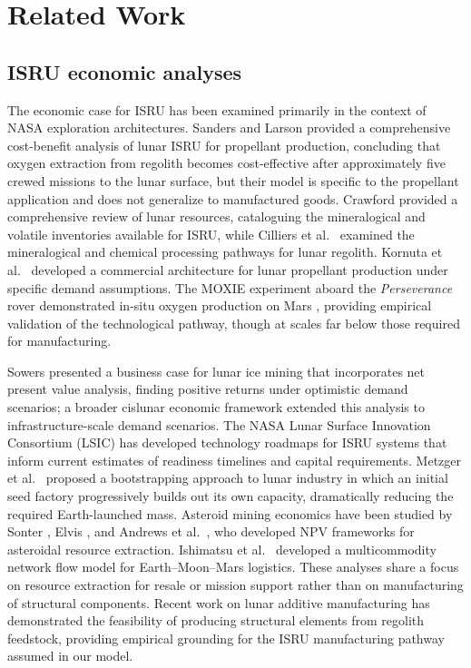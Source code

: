 \documentclass[preprint,12pt]{elsarticle}
\begin{document}
\section{Related Work}
\label{sec:related}

\subsection{ISRU economic analyses}

The economic case for ISRU has been examined primarily in the context of NASA exploration architectures. Sanders and Larson \cite{sanders2015} provided a comprehensive cost-benefit analysis of lunar ISRU for propellant production, concluding that oxygen extraction from regolith becomes cost-effective after approximately five crewed missions to the lunar surface, but their model is specific to the propellant application and does not generalize to manufactured goods. Crawford \cite{crawford2015} provided a comprehensive review of lunar resources, cataloguing the mineralogical and volatile inventories available for ISRU, while Cilliers et al.\ \cite{cilliers2023} examined the mineralogical and chemical processing pathways for lunar regolith. Kornuta et al.\ \cite{kornuta2019} developed a commercial architecture for lunar propellant production under specific demand assumptions. The MOXIE experiment aboard the \textit{Perseverance} rover demonstrated in-situ oxygen production on Mars \cite{hecht2021}, providing empirical validation of the technological pathway, though at scales far below those required for manufacturing.

Sowers \cite{sowers2021} presented a business case for lunar ice mining that incorporates net present value analysis, finding positive returns under optimistic demand scenarios; a broader cislunar economic framework \cite{sowers2023} extended this analysis to infrastructure-scale demand scenarios. The NASA Lunar Surface Innovation Consortium (LSIC) \cite{lsic2021} has developed technology roadmaps for ISRU systems that inform current estimates of readiness timelines and capital requirements. Metzger et al.\ \cite{metzger2013} proposed a bootstrapping approach to lunar industry in which an initial seed factory progressively builds out its own capacity, dramatically reducing the required Earth-launched mass. Asteroid mining economics have been studied by Sonter \cite{sonter1997}, Elvis \cite{elvis2012}, and Andrews et al.\ \cite{andrews2015}, who developed NPV frameworks for asteroidal resource extraction. Ishimatsu et al.\ \cite{ishimatsu2016} developed a multicommodity network flow model for Earth--Moon--Mars logistics. These analyses share a focus on resource extraction for resale or mission support rather than on manufacturing of structural components. Recent work on lunar additive manufacturing \cite{werkheiser2015,cesaretti2014} has demonstrated the feasibility of producing structural elements from regolith feedstock, providing empirical grounding for the ISRU manufacturing pathway assumed in our model.
\end{document}
